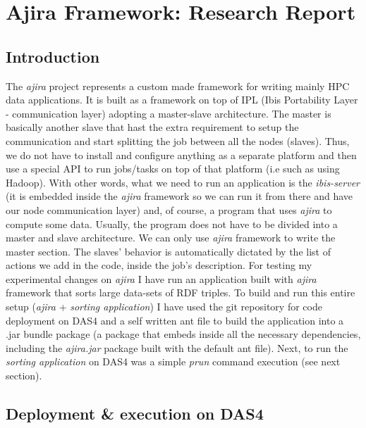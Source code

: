\section{Ajira Framework: Research Report}

\subsection{Introduction}

The \textit{ajira} project represents a custom made framework for writing mainly HPC data applications. It is built as a framework on top of IPL (Ibis Portability Layer - communication layer) adopting a master-slave architecture. The master is basically another slave that hast the extra requirement to setup the communication and start splitting the job between all the nodes (slaves). Thus, we do not have to install and configure anything as a separate platform and then use a special API to run jobs/tasks on top of that platform (i.e such as using Hadoop). With other words, what we need to run an application is the \textit{ibis-server} (it is embedded inside the \textit{ajira} framework so we can run it from there and have our node communication layer) and, of course, a program that uses \textit{ajira} to compute some data. Usually, the program does not have to be divided into a master and slave architecture. We can only use \textit{ajira} framework to write the master section. The slaves' behavior is automatically dictated by the list of actions we add in the code, inside the job's description. For testing my experimental changes on \textit{ajira} I have run an application built with \textit{ajira} framework that sorts large data-sets of RDF triples. To build and run this entire setup (\textit{ajira} + \textit{sorting application}) I have used the git repository for code deployment on DAS4 and a self written ant file \cite{build_file} to build the application into a .jar bundle package (a package that embeds inside all the necessary dependencies, including the \textit{ajira.jar} package built with the default ant file). Next, to run the \textit{sorting application} on DAS4 was a simple \textit{prun} command execution (see next section).

% 
\subsection{Deployment \& execution on DAS4}

